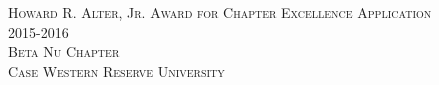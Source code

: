 \documentclass[oneside,openany]{book}
\begin{document}
  \begin{titlepage}
    \begin{center}
      \textsc{\Huge Howard R. Alter, Jr. Award for Chapter Excellence Application } \\[0.5cm]
      \textsc{\Huge 2015-2016} \\[1.0cm]
      \textsc{\Large Beta Nu Chapter} \\[0.3cm]
      \textsc{\Large Case Western Reserve University} \\[4.0cm]
    \end{center}
  \end{titlepage}

  \tableofcontents

  \frontmatter
    

  \mainmatter
    
    
    
    
    
    
    
    
    
    
    
    
    
\end{document}
